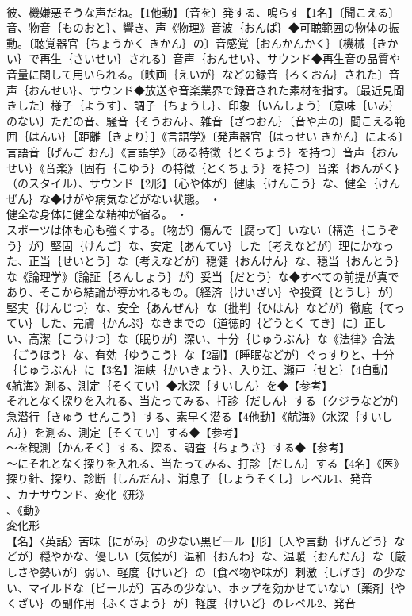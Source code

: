 \documentclass[8pt]{extreport}
\begin{document}
\begin{CJK}{UTF8}{min}
\\	彼、機嫌悪そうな声だね。【1他動】〔音を〕発する、鳴らす【1名】〔聞こえる〕音、物音｛ものおと｝、響き、声《物理》音波｛おんぱ｝◆可聴範囲の物体の振動。〔聴覚器官｛ちょうかく きかん｝の〕音感覚｛おんかんかく｝〔機械｛きかい｝で再生｛さいせい｝される〕音声｛おんせい｝、サウンド◆再生音の品質や音量に関して用いられる。〔映画｛えいが｝などの録音｛ろくおん｝された〕音声｛おんせい｝、サウンド◆放送や音楽業界で録音された素材を指す。〔最近見聞きした〕様子｛ようす｝、調子｛ちょうし｝、印象｛いんしょう｝〔意味｛いみ｝のない〕ただの音、騒音｛そうおん｝、雑音｛ざつおん｝〔音や声の〕聞こえる範囲｛はんい｝［距離｛きょり｝］《言語学》〔発声器官｛はっせい きかん｝による〕言語音｛げんご おん｝《言語学》〔ある特徴｛とくちょう｝を持つ〕音声｛おんせい｝《音楽》〔固有｛こゆう｝の特徴｛とくちょう｝を持つ〕音楽｛おんがく｝（のスタイル）、サウンド【2形】〔心や体が〕健康｛けんこう｝な、健全｛けんぜん｝な◆けがや病気などがない状態。 ・
\\	健全な身体に健全な精神が宿る。 ・
\\	スポーツは体も心も強くする。〔物が〕傷んで［腐って］いない〔構造｛こうぞう｝が〕堅固｛けんご｝な、安定｛あんてい｝した〔考えなどが〕理にかなった、正当｛せいとう｝な〔考えなどが〕穏健｛おんけん｝な、穏当｛おんとう｝な《論理学》〔論証｛ろんしょう｝が〕妥当｛だとう｝な◆すべての前提が真であり、そこから結論が導かれるもの。〔経済｛けいざい｝や投資｛とうし｝が〕堅実｛けんじつ｝な、安全｛あんぜん｝な〔批判｛ひはん｝などが〕徹底｛てってい｝した、完膚｛かんぷ｝なきまでの〔道徳的｛どうとく てき｝に〕正しい、高潔｛こうけつ｝な〔眠りが〕深い、十分｛じゅうぶん｝な《法律》合法｛ごうほう｝な、有効｛ゆうこう｝な【2副】〔睡眠などが〕ぐっすりと、十分｛じゅうぶん｝に【3名】海峡｛かいきょう｝、入り江、瀬戸｛せと｝【4自動】《航海》測る、測定｛そくてい｝◆水深｛すいしん｝を◆【参考】
\\	それとなく探りを入れる、当たってみる、打診｛だしん｝する〔クジラなどが〕急潜行｛きゅう せんこう｝する、素早く潜る【4他動】《航海》（水深｛すいしん｝）を測る、測定｛そくてい｝する◆【参考】
\\	～を観測｛かんそく｝する、探る、調査｛ちょうさ｝する◆【参考】
\\	～にそれとなく探りを入れる、当たってみる、打診｛だしん｝する【4名】《医》探り針、探り、診断｛しんだん｝、消息子｛しょうそくし｝レベル1、発音
\\	、カナサウンド、変化《形》
\\	、《動》
\\	変化形 
\\	【名】〈英話〉苦味｛にがみ｝の少ない黒ビール【形】〔人や言動｛げんどう｝などが〕穏やかな、優しい〔気候が〕温和｛おんわ｝な、温暖｛おんだん｝な〔厳しさや勢いが〕弱い、軽度｛けいど｝の〔食べ物や味が〕刺激｛しげき｝の少ない、マイルドな〔ビールが〕苦みの少ない、ホップを効かせていない〔薬剤｛やくざい｝の副作用｛ふくさよう｝が〕軽度｛けいど｝のレベル2、発音

\end{CJK}
\end{document}
